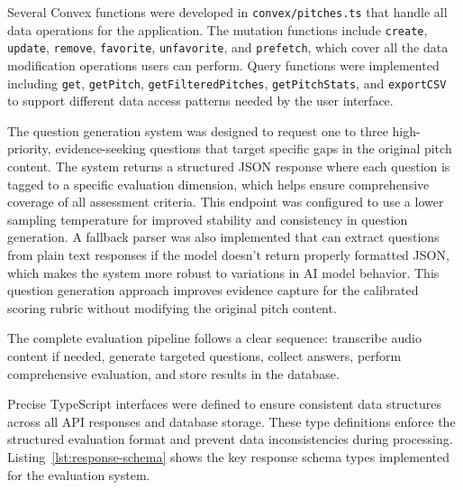 Several Convex functions were developed in \texttt{convex/pitches.ts} that handle all data operations for the application. The mutation functions include \texttt{create}, \texttt{update}, \texttt{remove}, \texttt{favorite}, \texttt{unfavorite}, and \texttt{prefetch}, which cover all the data modification operations users can perform. Query functions were implemented including \texttt{get}, \texttt{getPitch}, \texttt{getFilteredPitches}, \texttt{getPitchStats}, and \texttt{exportCSV} to support different data access patterns needed by the user interface.

The question generation system was designed to request one to three high-priority, evidence-seeking questions that target specific gaps in the original pitch content. The system returns a structured JSON response where each question is tagged to a specific evaluation dimension, which helps ensure comprehensive coverage of all assessment criteria. This endpoint was configured to use a lower sampling temperature for improved stability and consistency in question generation. A fallback parser was also implemented that can extract questions from plain text responses if the model doesn't return properly formatted JSON, which makes the system more robust to variations in AI model behavior. This question generation approach improves evidence capture for the calibrated scoring rubric without modifying the original pitch content.

The complete evaluation pipeline follows a clear sequence: transcribe audio content if needed, generate targeted questions, collect answers, perform comprehensive evaluation, and store results in the database.

Precise TypeScript interfaces were defined to ensure consistent data structures across all API responses and database storage. These type definitions enforce the structured evaluation format and prevent data inconsistencies during processing. Listing~\ref{lst:response-schema} shows the key response schema types implemented for the evaluation system.

